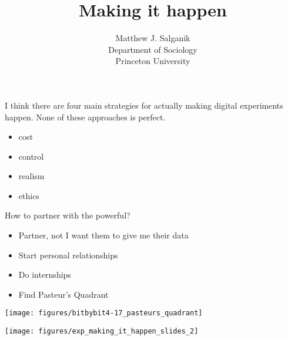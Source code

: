 \documentclass[aspectratio=169]{beamer}
\title[]{Making it happen}
\author[]{Matthew J. Salganik\\Department of Sociology\\Princeton University}
\date[]{Summer Institutes in Computational Social Science\\June 22, 2019
\vfill
\begin{flushleft}
{\scriptsize
The Summer Institutes in Computational Social Science is supported by grants from the Russell Sage Foundation and the Alfred P. Sloan Foundation.}
\end{flushleft}
\begin{flushright}
\texttt{[image: figures/cc-by.png]}
\end{flushright}
}
\begin{document}
\frame{\titlepage}
\begin{frame}

I think there are four main strategies for actually making digital experiments happen.  None of these approaches is perfect.
\begin{itemize}
\item cost
\pause
\item control
\pause
\item realism
\pause
\item ethics
\end{itemize}

\end{frame}
\begin{frame}

\begin{center}
\end{center}

\end{frame}
\begin{frame}

How to partner with the powerful?

\end{frame}
\begin{frame}

\begin{itemize}
\item Partner, not I want them to give me their data
\pause
\item Start personal relationships
\pause
\item Do internships
\pause
\item Find Pasteur's Quadrant
\end{itemize}

\end{frame}
\begin{frame}

\begin{center}
\texttt{[image: figures/bitbybit4-17\_pasteurs\_quadrant]}
\end{center}

\end{frame}
\begin{frame}

\begin{center}
\texttt{[image: figures/exp\_making\_it\_happen\_slides\_2]}
\end{center}

\end{frame}
\end{document}
